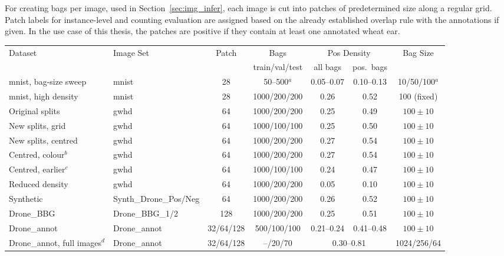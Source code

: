 \documentclass[12pt,parskip = half, DIV=classic,listof=totoc]{scrartcl}
\begin{document}
			For creating bags per image, used in Section~\ref{sec:img_infer}, each image is cut into patches of predetermined size along a regular grid. 
			Patch labels for instance-level and counting evaluation are assigned based on the 
			already established overlap rule with the annotations if given. In the use case of this thesis, the patches are positive if they 
			contain at least one annotated wheat ear.
		\begin{table}[t]
				\centering
				\scriptsize
				\setlength{\tabcolsep}{3.5pt}
				\begin{tabular}{@{}llccccc@{}}
					\toprule
					\multirow{2}{*}{Dataset} & \multirow{2}{*}{Image Set} & \multirow{2}{*}{Patch} & Bags & \multicolumn{2}{c}{Pos Density} & \multirow{2}{*}{Bag Size} \\
					\cmidrule(lr){5-6}
					& & & train/val/test & all bags & pos.\ bags & \\
					\midrule
					\acs*{mnist}, bag-size sweep & \acs*{mnist} & 28 & 50--500$^{a}$ & 0.05--0.07 & 0.10--0.13 & 10/50/100$^{a}$ \\
					\acs*{mnist}, high density & \acs*{mnist} & 28 & 1000/200/200 & 0.26 & 0.52 & 100 (fixed) \\
					\midrule
					Original splits & \acs*{gwhd} & 64 & 1000/200/200 & 0.25 & 0.49 & $100\pm10$ \\
					New splits, grid & \acs*{gwhd} & 64 & 1000/100/100 & 0.25 & 0.50 & $100\pm10$ \\
					New splits, centred & \acs*{gwhd} & 64 & 1000/200/200 & 0.27 & 0.54 & $100\pm10$ \\
					Centred, colour$^{b}$ & \acs*{gwhd} & 64 & 1000/200/200 & 0.27 & 0.54 & $100\pm10$ \\
					Centred, earlier$^{c}$ & \acs*{gwhd} & 64 & 1000/100/100 & 0.24 & 0.47 & $100\pm10$ \\
					Reduced density & \acs*{gwhd} & 64 & 1000/200/200 & 0.05 & 0.10 & $100\pm10$ \\
					\midrule
					Synthetic & Synth\_Drone\_Pos/Neg & 64 & 1000/200/200 & 0.26 & 0.52 & $100\pm10$ \\
					Drone\_BBG & Drone\_BBG\_1/2 & 128 & 1000/200/200 & 0.25 & 0.51 & $100\pm10$ \\
					Drone\_annot & Drone\_annot & 32/64/128 & 500/100/100 & 0.21--0.24 & 0.41--0.48 & $100\pm10$ \\
					Drone\_annot, full images$^{d}$ & Drone\_annot & 32/64/128 & --/20/70 & \multicolumn{2}{c}{0.30--0.81} & 1024/256/64 \\

\end{tabular}
\end{table}
\end{document}

